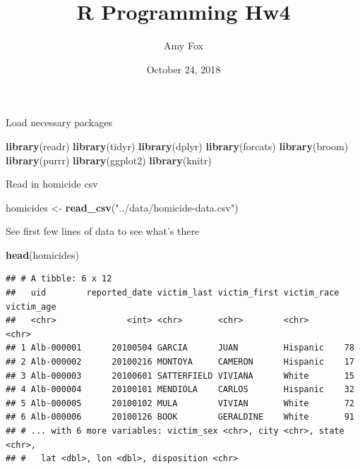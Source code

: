 \documentclass[]{article}
\title{R Programming Hw4}
\author{Amy Fox}
\date{October 24, 2018}
\newenvironment{Shaded}{\begin{snugshade}}{\end{snugshade}}
\newcommand{\DataTypeTok}[1]{\textcolor[rgb]{0.13,0.29,0.53}{#1}}
\newcommand{\KeywordTok}[1]{\textcolor[rgb]{0.13,0.29,0.53}{\textbf{#1}}}
\newcommand{\NormalTok}[1]{#1}
\newcommand{\OperatorTok}[1]{\textcolor[rgb]{0.81,0.36,0.00}{\textbf{#1}}}
\newcommand{\OtherTok}[1]{\textcolor[rgb]{0.56,0.35,0.01}{#1}}
\newcommand{\StringTok}[1]{\textcolor[rgb]{0.31,0.60,0.02}{#1}}
\begin{document}
\maketitle

\begin{Shaded}
\end{Shaded}

Load necessary packages

\begin{Shaded}
\begin{Highlighting}[]
\KeywordTok{library}\NormalTok{(readr)}
\KeywordTok{library}\NormalTok{(tidyr)}
\KeywordTok{library}\NormalTok{(dplyr)}
\KeywordTok{library}\NormalTok{(forcats)}
\KeywordTok{library}\NormalTok{(broom)}
\KeywordTok{library}\NormalTok{(purrr)}
\KeywordTok{library}\NormalTok{(ggplot2)}
\KeywordTok{library}\NormalTok{(knitr)}
\end{Highlighting}
\end{Shaded}

Read in homicide csv

\begin{Shaded}
\begin{Highlighting}[]
\NormalTok{homicides <-}\StringTok{ }\KeywordTok{read_csv}\NormalTok{(}\StringTok{"../data/homicide-data.csv"}\NormalTok{)}
\end{Highlighting}
\end{Shaded}

See first few lines of data to see what's there

\begin{Shaded}
\begin{Highlighting}[]
\KeywordTok{head}\NormalTok{(homicides)}
\end{Highlighting}
\end{Shaded}

\begin{verbatim}
## # A tibble: 6 x 12
##   uid        reported_date victim_last victim_first victim_race victim_age
##   <chr>              <int> <chr>       <chr>        <chr>       <chr>     
## 1 Alb-000001      20100504 GARCIA      JUAN         Hispanic    78        
## 2 Alb-000002      20100216 MONTOYA     CAMERON      Hispanic    17        
## 3 Alb-000003      20100601 SATTERFIELD VIVIANA      White       15        
## 4 Alb-000004      20100101 MENDIOLA    CARLOS       Hispanic    32        
## 5 Alb-000005      20100102 MULA        VIVIAN       White       72        
## 6 Alb-000006      20100126 BOOK        GERALDINE    White       91        
## # ... with 6 more variables: victim_sex <chr>, city <chr>, state <chr>,
## #   lat <dbl>, lon <dbl>, disposition <chr>
\end{verbatim}
\end{document}
